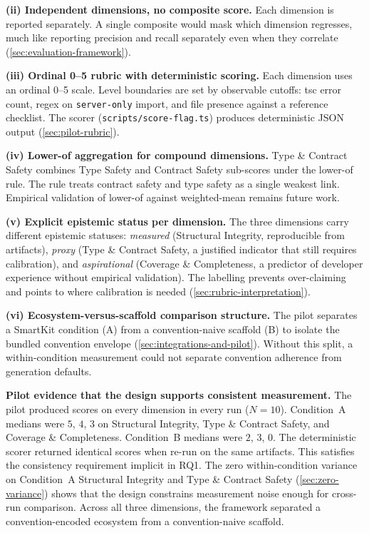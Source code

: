 \documentclass[12pt,a4paper]{report}
\newcommand{\pkg}[1]{\texttt{\nolinkurl{#1}}}
\DeclareRobustCommand{\filename}[1]{\bgroup\urlstyle{tt}\nolinkurl{#1}\egroup}
\begin{document}
\textbf{(ii) Independent dimensions, no composite score.} Each dimension is reported separately. A single composite would mask which dimension regresses, much like reporting precision and recall separately even when they correlate (\autoref{sec:evaluation-framework}).

\textbf{(iii) Ordinal 0--5 rubric with deterministic scoring.} Each dimension uses an ordinal 0--5 scale. Level boundaries are set by observable cutoffs: tsc error count, regex on \pkg{server-only} import, and file presence against a reference checklist. The scorer (\filename{scripts/score-flag.ts}) produces deterministic JSON output (\autoref{sec:pilot-rubric}).

\textbf{(iv) Lower-of aggregation for compound dimensions.} Type \& Contract Safety combines Type Safety and Contract Safety sub-scores under the lower-of rule. The rule treats contract safety and type safety as a single weakest link. Empirical validation of lower-of against weighted-mean remains future work.

\textbf{(v) Explicit epistemic status per dimension.} The three dimensions carry different epistemic statuses: \emph{measured} (Structural Integrity, reproducible from artifacts), \emph{proxy} (Type \& Contract Safety, a justified indicator that still requires calibration), and \emph{aspirational} (Coverage \& Completeness, a predictor of developer experience without empirical validation). The labelling prevents over-claiming and points to where calibration is needed (\autoref{sec:rubric-interpretation}).

\textbf{(vi) Ecosystem-versus-scaffold comparison structure.} The pilot separates a SmartKit condition (A) from a convention-naive scaffold (B) to isolate the bundled convention envelope (\autoref{sec:integrations-and-pilot}). Without this split, a within-condition measurement could not separate convention adherence from generation defaults.

\textbf{Pilot evidence that the design supports consistent measurement.} The pilot produced scores on every dimension in every run ($N=10$). Condition~A medians were $5$, $4$, $3$ on Structural Integrity, Type \& Contract Safety, and Coverage \& Completeness. Condition~B medians were $2$, $3$, $0$. The deterministic scorer returned identical scores when re-run on the same artifacts. This satisfies the consistency requirement implicit in RQ1. The zero within-condition variance on Condition~A Structural Integrity and Type \& Contract Safety (\autoref{sec:zero-variance}) shows that the design constrains measurement noise enough for cross-run comparison. Across all three dimensions, the framework separated a convention-encoded ecosystem from a convention-naive scaffold.
\end{document}
